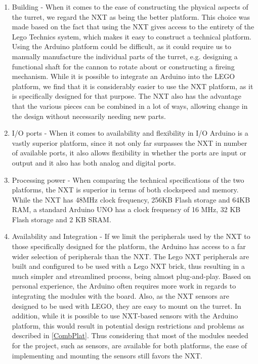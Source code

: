 \begin{enumerate}
  \item Building - When it comes to the ease of constructing the physical
  aspects of the turret, we regard the NXT as being the better platform. This
  choice was made based on the fact that using the NXT gives access to the
  entirety of the Lego Technics system, which makes it easy to construct a
  technical platform. Using the Arduino platform could be difficult, as it could
  require us to manually manufacture the individual parts of the turret, e.g.
  designing a functional shaft for the cannon to rotate about or constructing a
  fireing mechanism.
  While it is possible to integrate an Arduino into the LEGO platform, we find
  that it is considerably easier to use the NXT platform, as it is specifically
  designed for that purpose. The NXT also has the advantage that the various
  pieces can be combined in a lot of ways, allowing change in the design without
  necessarily needing new parts.

  \item I/O ports - When it comes to availability and flexibility in I/O
  Arduino is a vastly superior platform, since it not only far surpasses the NXT
  in number of available ports, it also allows flexibility in whether the ports
  are input or output and it also has both analog and digital ports.
  
  \item Processing power - When comparing the technical specifications of the
  two platforms, the NXT is superior in terms of both clockspeed and memory.
  While the NXT has 48MHz clock frequency, 256KB Flash storage and 64KB RAM, a
  standard Arduino UNO has a clock frequency of 16 MHz, 32 KB Flash storage and
  2 KB SRAM.
  
  \item Availability and Integration - If we limit the peripherals used by the
  NXT to those specifically designed for the platform, the Arduino has access
  to a far wider selection of peripherals than the NXT. The Lego NXT
  peripherals are built and configured to be used with a Lego NXT brick, thus
  resulting in a much simpler and streamlined process, being almost
  plug-and-play. Based on personal experience, the Arduino often requires more
  work in regards to integrating the modules with the board. Also, as the NXT
  sensors are designed to be used with LEGO, they are easy to mount on the
  turret. In addition, while it is possible to use NXT-based sensors with the
  Arduino platform, this would result in potential design restrictions and
  problems as described in \autoref{CombPlat}. Thus considering that most of
  the modules needed for the project, such as sensors, are available for both
  platforms, the ease of implementing and mounting the sensors still favors the
  NXT.
\end{enumerate}

